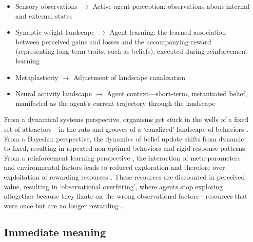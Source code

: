 \begin{itemize}
    \item Sensory observations \(\rightarrow\) Active agent perception: observations about internal and external states
    \item Synaptic weight landscape \(\rightarrow\) Agent learning: the learned association between perceived gains and losses and the accompanying reward (representing long-term traits, such as beliefs), executed during reinforcement learning
    \item Metaplasticity \(\rightarrow\) Adjustment of landscape canalization
    \item Neural activity landscape \(\rightarrow\) Agent context—short-term, instantiated belief, manifested as the agent's current trajectory through the landscape
\end{itemize}

From a dynamical systems perspective, organisms get stuck in the wells of a fixed set of attractors—in the ruts and grooves of a ‘canalized’ landscape of behaviors \cite{waddington_canalization_1959, carhart-harris_canalization_2023}. From a Bayesian perspective, the dynamics of belief update shifts from dynamic to fixed, resulting in repeated non-optimal behaviors \cite{harle_anhedonia_2017} and rigid response patterns. From a reinforcement learning perspective \cite{sutton_reinforcement_1998}, the interaction of meta-parameters and environmental factors leads to reduced exploration and therefore over-exploitation of rewarding resources \cite{huys_mapping_2013}. These resources are discounted in perceived value, resulting in ‘observational overfitting’, where agents stop exploring altogether because they fixate on the wrong observational factors—resources that were once but are no longer rewarding \cite{song_observational_2019}.


\subsection{Immediate meaning}

